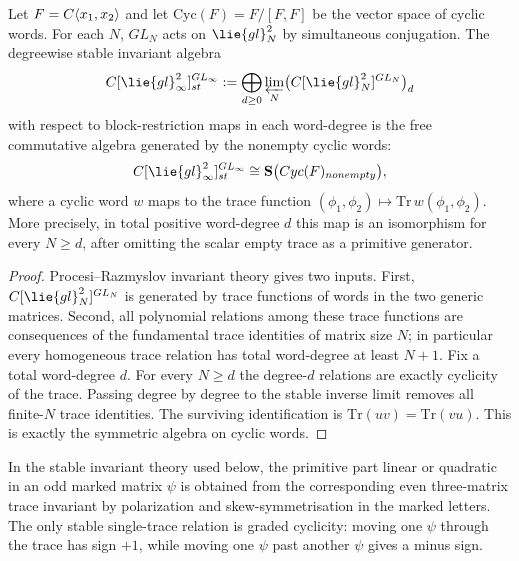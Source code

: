\documentclass[11pt]{memoir}
\begin{document}
\begin{prop}\label{prop:stable-trace-invariants}
  Let $F=C\langle x_1,x_2\rangle$ and let $\mathrm{Cyc}(F)=F/[F,F]$ be the
  vector space of cyclic words. For each $N$, $GL_N$ acts on
  $\lie{gl}_N^2$ by simultaneous conjugation. The degreewise stable invariant
  algebra
  $$\C[\lie{gl}_\infty^2]^{GL_\infty}_{\mathrm{st}}
    :=\bigoplus_{d\geq0}\varprojlim_N
      \bigl(\C[\lie{gl}_N^2]^{GL_N}\bigr)_d$$
  with respect to block-restriction maps in each word-degree
  is the free commutative algebra generated by the nonempty cyclic words:
  $$\C[\lie{gl}_\infty^2]^{GL_\infty}_{\mathrm{st}}
    \cong\mathbf S\bigl(\mathrm{Cyc}(F)_{\mathrm{nonempty}}\bigr),$$
  where a cyclic word $w$ maps to the trace function
  $(\phi_1,\phi_2)\mapsto\mathrm{Tr}\,w(\phi_1,\phi_2)$.
  More precisely, in total positive word-degree $d$ this map is an isomorphism
  for every $N\geq d$, after omitting the scalar empty trace as a primitive
  generator.
\end{prop}

\begin{proof}
  Procesi--Razmyslov invariant theory \cites{procesi,razmyslov} gives two
  inputs. First, $\C[\lie{gl}_N^2]^{GL_N}$ is generated by trace functions of
  words in the two generic matrices. Second, all polynomial relations among
  these trace functions are consequences of the fundamental trace identities
  of matrix size $N$; in particular every homogeneous trace relation has total
  word-degree at least $N+1$. Fix a total word-degree $d$. For every
  $N\geq d$ the degree-$d$ relations are exactly cyclicity of the trace.
  Passing degree by degree to the stable inverse limit removes
  all finite-$N$ trace identities. The surviving identification is
  $\mathrm{Tr}(uv)=\mathrm{Tr}(vu)$. This is exactly the symmetric algebra on
  cyclic words.
\end{proof}

\begin{lem}\label{lem:stable-marked-traces}
  In the stable invariant theory used below, the primitive part linear or
  quadratic in an odd marked matrix $\psi$ is obtained from the corresponding
  even three-matrix trace invariant by polarization and skew-symmetrisation in
  the marked letters. The only stable single-trace relation is graded cyclicity:
  moving one $\psi$ through the trace has sign $+1$, while moving one $\psi$
  past another $\psi$ gives a minus sign.
\end{lem}
\end{document}
